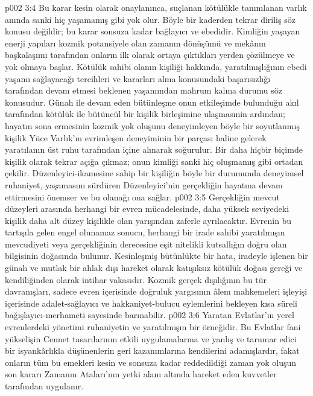 \vs p002 3:4 Bu karar kesin olarak onaylanınca, suçlanan kötülükle tanımlanan varlık anında sanki hiç yaşamamış gibi yok olur. Böyle bir kaderden tekrar diriliş söz konusu değildir; bu karar sonsuza kadar bağlayıcı ve ebedidir. Kimliğin yaşayan enerji yapıları kozmik potansiyele olan zamanın dönüşümü ve mekânın başkalaşımı tarafından onların ilk olarak ortaya çıktıkları yerden çözülmeye ve yok olmaya başlar. Kötülük sahibi olanın kişiliği hakkında, yaratılmışlığının ebedi yaşamı sağlayacağı tercihleri ve kararları alma konusundaki başarısızlığı tarafından devam etmesi beklenen yaşamından mahrum kalma durumu söz konusudur. Günah ile devam eden bütünleşme onun etkileşimde bulunduğu akıl tarafından kötülük ile bütüncül bir kişilik birleşimine ulaşmasınin ardından; hayatın sona ermesinin kozmik yok oluşunu deneyimleyen böyle bir soyutlanmış kişilik Yüce Varlık’ın evrimleşen deneyiminin bir parçası haline gelerek yaratılanın üst ruhu tarafından içine alınarak soğurulur. Bir daha hiçbir biçimde kişilik olarak tekrar açığa çıkmaz; onun kimliği sanki hiç oluşmamış gibi ortadan çekilir. Düzenleyici\hyp{}ikamesine sahip bir kişiliğin böyle bir durumunda deneyimsel ruhaniyet, yaşamasını sürdüren Düzenleyici’nin gerçekliğin hayatına devam ettirmesini önemser ve bu olanağı ona sağlar.
\vs p002 3:5 Gerçekliğin mevcut düzeyleri arasında herhangi bir evren mücadelesinde, daha yüksek seviyedeki kişilik daha alt düzey kişilikle olan yarışından zaferle ayrılacaktır. Evrenin bu tartışıla gelen engel olunamaz sonucu, herhangi bir irade sahibi yaratılmışın mevcudiyeti veya gerçekliğinin derecesine eşit nitelikli kutsallığın doğru olan bilgisinin doğasında bulunur. Kesinleşmiş bütünlükte bir hata, iradeyle işlenen bir günah ve mutlak bir ahlak dışı hareket olarak katışıksız kötülük doğası gereği ve kendiliğinden olarak intihar vakasıdır. Kozmik gerçek dışılığının bu tür davranışları, sadece evren içerisinde doğruluk yargısının âlem mahkemeleri işleyişi içerisinde adalet\hyp{}sağlayıcı ve hakkaniyet\hyp{}bulucu eylemlerini bekleyen kısa süreli bağışlayıcı\hyp{}merhameti sayesinde barınabilir.
\vs p002 3:6 Yaratan Evlatlar’ın yerel evrenlerdeki yönetimi ruhaniyetin ve yaratılmışın bir örneğidir. Bu Evlatlar fani yükselişin Cennet tasarılarının etkili uygulamalarına ve yanlış ve tarumar edici bir isyankârlıkla düşünenlerin geri kazanımlarına kendilerini adamışlardır, fakat onların tüm bu emekleri kesin ve sonsuza kadar reddedildiği zaman yok oluşun son kararı Zamanın Ataları’nın yetki alanı altında hareket eden kuvvetler tarafından uygulanır.
